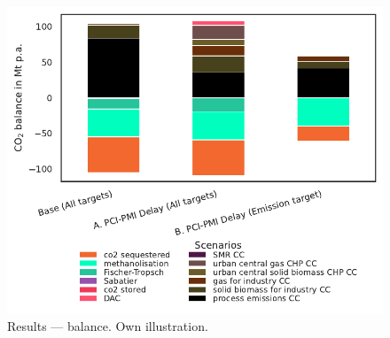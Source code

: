 \documentclass[preprint,12pt]{elsarticle}
\begin{document}
\begin{figure}[htbp]
  \centering
  \includegraphics[width=0.9\linewidth]{co2_balance}
  \caption{Results ---  balance. Own illustration.}
  \label{fig:co2_balance}
\end{figure}
\end{document}
